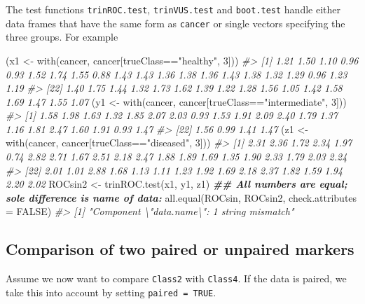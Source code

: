 \documentclass[
]{article}
\newenvironment{Shaded}{\begin{snugshade}}{\end{snugshade}}
\newcommand{\AttributeTok}[1]{\textcolor[rgb]{0.77,0.63,0.00}{#1}}
\newcommand{\CommentTok}[1]{\textcolor[rgb]{0.56,0.35,0.01}{\textit{#1}}}
\newcommand{\ConstantTok}[1]{\textcolor[rgb]{0.00,0.00,0.00}{#1}}
\newcommand{\DecValTok}[1]{\textcolor[rgb]{0.00,0.00,0.81}{#1}}
\newcommand{\DocumentationTok}[1]{\textcolor[rgb]{0.56,0.35,0.01}{\textbf{\textit{#1}}}}
\newcommand{\FunctionTok}[1]{\textcolor[rgb]{0.00,0.00,0.00}{#1}}
\newcommand{\NormalTok}[1]{#1}
\newcommand{\OtherTok}[1]{\textcolor[rgb]{0.56,0.35,0.01}{#1}}
\newcommand{\SpecialCharTok}[1]{\textcolor[rgb]{0.00,0.00,0.00}{#1}}
\newcommand{\StringTok}[1]{\textcolor[rgb]{0.31,0.60,0.02}{#1}}
\begin{document}
The test functions \texttt{trinROC.test}, \texttt{trinVUS.test} and
\texttt{boot.test} handle either data frames that have the same form as
\texttt{cancer} or single vectors specifying the three groups. For
example

\begin{Shaded}
\begin{Highlighting}[]
\NormalTok{(x1 }\OtherTok{\textless{}{-}} \FunctionTok{with}\NormalTok{(cancer, cancer[trueClass}\SpecialCharTok{==}\StringTok{"healthy"}\NormalTok{, }\DecValTok{3}\NormalTok{]))}
\CommentTok{\#\textgreater{}  [1] 1.21 1.50 1.10 0.96 0.93 1.52 1.74 1.55 0.88 1.43 1.43 1.36 1.38 1.36 1.43 1.38 1.32 1.29 0.96 1.23 1.19}
\CommentTok{\#\textgreater{} [22] 1.40 1.75 1.44 1.32 1.73 1.62 1.39 1.22 1.28 1.56 1.05 1.42 1.58 1.69 1.47 1.55 1.07}
\NormalTok{(y1 }\OtherTok{\textless{}{-}} \FunctionTok{with}\NormalTok{(cancer, cancer[trueClass}\SpecialCharTok{==}\StringTok{"intermediate"}\NormalTok{, }\DecValTok{3}\NormalTok{]))}
\CommentTok{\#\textgreater{}  [1] 1.58 1.98 1.63 1.32 1.85 2.07 2.03 0.93 1.53 1.91 2.09 2.40 1.79 1.37 1.16 1.81 2.47 1.60 1.91 0.93 1.47}
\CommentTok{\#\textgreater{} [22] 1.56 0.99 1.41 1.47}
\NormalTok{(z1 }\OtherTok{\textless{}{-}} \FunctionTok{with}\NormalTok{(cancer, cancer[trueClass}\SpecialCharTok{==}\StringTok{"diseased"}\NormalTok{, }\DecValTok{3}\NormalTok{]))}
\CommentTok{\#\textgreater{}  [1] 2.31 2.36 1.72 2.34 1.97 0.74 2.82 2.71 1.67 2.51 2.18 2.47 1.88 1.89 1.69 1.35 1.90 2.33 1.79 2.03 2.24}
\CommentTok{\#\textgreater{} [22] 2.01 1.01 2.88 1.68 1.13 1.11 1.23 1.92 1.69 2.18 2.37 1.82 1.59 1.94 2.20 2.02}
\NormalTok{ROCsin2 }\OtherTok{\textless{}{-}} \FunctionTok{trinROC.test}\NormalTok{(x1, y1, z1)}
\DocumentationTok{\#\# All numbers are equal; sole difference is name of data:}
\FunctionTok{all.equal}\NormalTok{(ROCsin, ROCsin2, }\AttributeTok{check.attributes =} \ConstantTok{FALSE}\NormalTok{)}
\CommentTok{\#\textgreater{} [1] "Component \textbackslash{}"data.name\textbackslash{}": 1 string mismatch"}
\end{Highlighting}
\end{Shaded}

\hypertarget{comparison-of-two-paired-or-unpaired-markers}{%
\subsection{Comparison of two paired or unpaired
markers}\label{comparison-of-two-paired-or-unpaired-markers}}

Assume we now want to compare \texttt{Class2} with \texttt{Class4}. If
the data is paired, we take this into account by setting
\texttt{paired\ =\ TRUE}.
\end{document}
